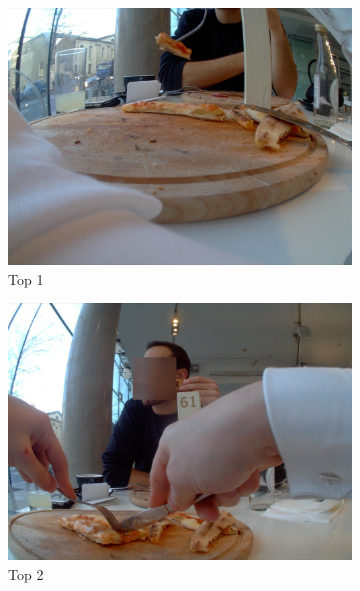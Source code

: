 \newpage

\begin{figure}[H]
  \centering
  \captionsetup{justification=centering}

  \begin{subfigure}{0.32\textwidth}
    \includegraphics[width=\textwidth]{Sections/7Results/images/top1.jpg} 
    \caption{Top 1}
  \end{subfigure}
  \begin{subfigure}{0.32\textwidth}
    \includegraphics[width=\textwidth]{Sections/7Results/images/top2.jpg}\hfill
    \caption{Top 2}
  \end{subfigure}
  \begin{subfigure}{0.32\textwidth}

\end{subfigure}
\end{figure}
